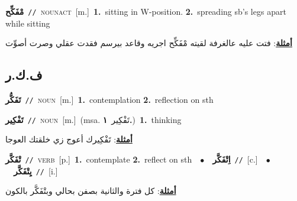 \documentclass[10pt,a4paper,twoside]{article} %
\begin{document}
\begin{multicols}{2}
{\setlength\topsep{0pt}\textbf{\foreignlanguage{arabic}{مْفَكِّح}}\ {\color{gray}\texttt{//}\color{black}}\ \textsc{noun\textunderscore act}\ [m.]\ \textbf{1.}~sitting in W-position.  \textbf{2.}~spreading sb's legs apart while sitting\  \begin{flushright}\color{gray}\foreignlanguage{arabic}{\textbf{\underline{\foreignlanguage{arabic}{أمثلة}}}: فتت عليه عالغرفة لقيته مْفَكِّح اجريه وقاعد بيرسم فقدت عقلي وصرت أصوِّت}\end{flushright}\color{black}} \vspace{2mm}

\vspace{-3mm}
\subsection*{\color{blue}\foreignlanguage{arabic}{ف.ك.ر}\color{blue}{}} 

{\setlength\topsep{0pt}\textbf{\foreignlanguage{arabic}{تَفَكُّر}}\ {\color{gray}\texttt{//}\color{black}}\ \textsc{noun}\ [m.]\ \textbf{1.}~contemplation  \textbf{2.}~reflection on sth\ } \vspace{2mm}

{\setlength\topsep{0pt}\textbf{\foreignlanguage{arabic}{تَفْكِير}}\ {\color{gray}\texttt{//}\color{black}}\ \textsc{noun}\ [m.]\ \color{gray}(msa. \foreignlanguage{arabic}{تَفْكِير}~\foreignlanguage{arabic}{\textbf{١.}})\color{black}\ \textbf{1.}~thinking\  \begin{flushright}\color{gray}\foreignlanguage{arabic}{\textbf{\underline{\foreignlanguage{arabic}{أمثلة}}}: تَفْكِيرك أعوج زي خلقتك العوجا}\end{flushright}\color{black}} \vspace{2mm}

{\setlength\topsep{0pt}\textbf{\foreignlanguage{arabic}{تْفَكَّر}}\ {\color{gray}\texttt{//}\color{black}}\ \textsc{verb}\ [p.]\ \textbf{1.}~contemplate  \textbf{2.}~reflect on sth\ \ $\bullet$\ \ \setlength\topsep{0pt}\textbf{\foreignlanguage{arabic}{اِتْفَكَّر}}\ {\color{gray}\texttt{//}\color{black}}\ [c.]\ \ $\bullet$\ \ \setlength\topsep{0pt}\textbf{\foreignlanguage{arabic}{يِتْفَكَّر}}\ {\color{gray}\texttt{//}\color{black}}\ [i.]\  \begin{flushright}\color{gray}\foreignlanguage{arabic}{\textbf{\underline{\foreignlanguage{arabic}{أمثلة}}}: كل فترة والثانية بصفن بحالي وبتْفَكَّر بالكون}\end{flushright}\color{black}} \vspace{2mm}


\end{multicols}
\end{document}
